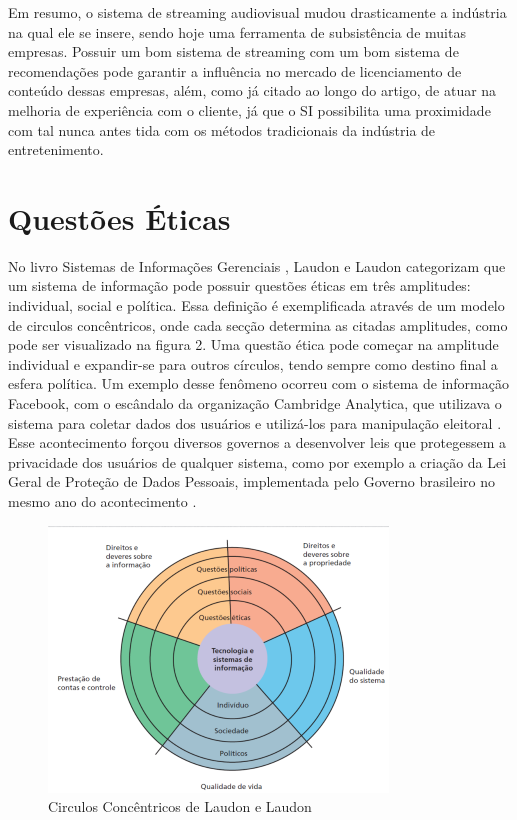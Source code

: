 \documentclass[conference]{IEEEtran}
\begin{document}
Em resumo, o sistema de streaming audiovisual mudou drasticamente a indústria na qual ele se insere, sendo hoje uma ferramenta de subsistência de muitas empresas. Possuir um bom sistema de streaming com um bom sistema de recomendações pode garantir a influência no mercado de licenciamento de conteúdo dessas empresas, além, como já citado ao longo do artigo, de atuar na melhoria de experiência com o cliente, já que o SI possibilita uma proximidade com tal nunca antes tida com os métodos tradicionais da indústria de entretenimento.

\section{Questões Éticas}
No livro Sistemas de Informações Gerenciais \cite{b3}, Laudon e Laudon categorizam que um sistema de informação pode possuir questões éticas em três amplitudes: individual, social e política. Essa definição é exemplificada através de um modelo de circulos concêntricos, onde cada secção determina as citadas amplitudes, como pode ser visualizado na figura 2. Uma questão ética pode começar na amplitude individual e expandir-se para outros círculos, tendo sempre como destino final a esfera política. Um exemplo desse fenômeno ocorreu com o sistema de informação Facebook, com o escândalo da organização Cambridge Analytica, que utilizava o sistema para coletar dados dos usuários e utilizá-los para manipulação eleitoral \cite{b11}. Esse acontecimento forçou diversos governos a desenvolver leis que protegessem a privacidade dos usuários de qualquer sistema, como por exemplo a criação da Lei Geral de Proteção de Dados Pessoais, implementada pelo Governo brasileiro no mesmo ano do acontecimento \cite{b12}.

\begin{figure}[htbp]
\centerline{\includegraphics{fig2.png}}
\caption{Circulos Concêntricos de Laudon e Laudon}
\label{fig}
\end{figure}
\end{document}
